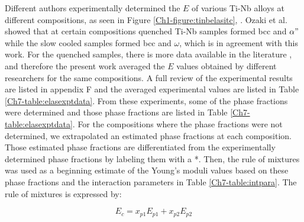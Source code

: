 Different authors experimentally determined the $E$ of various Ti-Nb alloys at different compositions, as seen in Figure \ref{Ch1-figure:tinbelasitc}, \cite{Friak2012,Timoshevskii2011,Friak2012,Karre2015}. Ozaki et al. \cite{Ozaki2004} showed that at certain compositions quenched Ti-Nb samples formed bcc and $\alpha"$ while the slow cooled samples formed bcc and $\omega$, which is in agreement with this work. For the quenched samples, there is more data available in the literature \cite{Friak2012,Timoshevskii2011,Friak2012,Karre2015}, and therefore the present work averaged the $E$ values obtained by different researchers for the same compositions. A full review of the experimental results are listed in appendix F and the averaged experimental values are listed in Table \ref{Ch7-table:elasexptdata}. From these experiments, some of the phase fractions were determined \cite{Friak2012} and those phase fractions are listed in Table \ref{Ch7-table:elasexptdata}. For the compositions where the phase fractions were not determined, we extrapolated an estimated phase fractions at each composition. Those estimated phase fractions are differentiated from the experimentally determined phase fractions by labeling them with a *. Then, the rule of mixtures was used as a beginning estimate of the Young's moduli values based on these phase fractions and the interaction parameters in Table \ref{Ch7-table:intpara}. The rule of mixtures is expressed by:

\begin{equation}
\label{eq:ruleofmix}
E_{c}=x_{p1}E_{p1}+x_{p2}E_{p2}
\end{equation}

